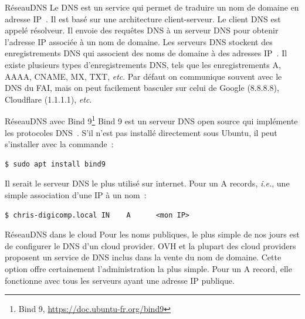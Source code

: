 \documentclass{beamer}
\begin{document}
    \begin{frame}{Réseau}{DNS}
        Le DNS est un service qui permet de traduire un nom de domaine en adresse IP~.
        Il est basé sur une architecture client-serveur.
        \bigbreak
        Le client DNS est appelé résolveur.
        Il envoie des requêtes DNS à un serveur DNS pour obtenir l'adresse IP associée à un nom de domaine.
        \bigbreak
        Les serveurs DNS stockent des enregistrements DNS qui associent des noms de domaine à des adresses IP~.
        Il existe plusieurs types d'enregistrements DNS, tels que les enregistrements A, AAAA, CNAME, MX, TXT, \textit{etc}.
        \bigbreak
        Par défaut on communique souvent avec le DNS du FAI, mais on peut facilement basculer sur celui de Google (8.8.8.8), Cloudflare (1.1.1.1), \textit{etc}.
    \end{frame}

    \begin{frame}[fragile]{Réseau}{DNS avec Bind 9\footnote{Bind 9, \url{https://doc.ubuntu-fr.org/bind9}}}
        Bind 9 est un serveur DNS open source qui implémente les protocoles DNS~.
        S'il n'est pas installé directement sous Ubuntu, il peut s'installer avec la commande~:
        \begin{lstlisting}
$ sudo apt install bind9
        \end{lstlisting}
        Il serait le serveur DNS le plus utilisé sur internet.
        \bigbreak
        Pour un A records, \textit{i.e.}, une simple association d'une IP à un nom~:
        \begin{lstlisting}
$ chris-digicomp.local IN    A      <mon IP>
        \end{lstlisting}
        \bigbreak
    \end{frame}

    \begin{frame}{Réseau}{DNS dans le cloud}
        Pour les noms publiques, le plus simple de nos jours est de configurer le DNS d'un cloud provider.
        \bigbreak
        OVH et la plupart des cloud providers proposent un service de DNS inclus dans la vente du nom de domaine.
        \bigbreak
        Cette option offre certainement l'administration la plus simple.
        Pour un A record, elle fonctionne avec tous les serveurs ayant une adresse IP publique.
    \end{frame}
\end{document}

